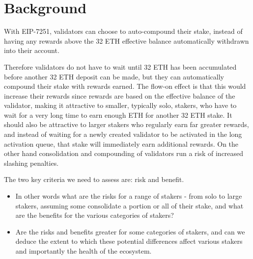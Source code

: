 \documentclass{article}
\begin{document}
%



\section{Background}
\label{EIP-7251}

With EIP-7251, validators can choose to auto-compound their stake, instead of
having any rewards above the 32 ETH effective balance automatically withdrawn
into their account.

Therefore validators do not have to wait until 32 ETH has been accumulated 
before another 32 ETH deposit can be made, but they can automatically compound
their stake with rewards earned. The flow-on effect is that this would increase
their rewards since rewards are based on the effective balance of the
validator, making it attractive to smaller, typically solo, stakers, who have
to wait for a very long time to earn enough ETH for another 32 ETH stake. It
should also be attractive to larger stakers who regularly earn far greater
rewards, and  instead of waiting for a newly created validator to be activated
in the long  activation queue, that stake will immediately earn additional
rewards. On the  other hand consolidation and compounding of validators run a
risk of increased slashing penalties.

The two key criteria we need to assess are: risk and benefit. 
\begin{itemize}
  \item In other words what are the risks for a range of stakers - from solo to
    large stakers, assuming some consolidate a portion or all of their stake,
    and what are the benefits for the various categories of stakers?
  \item  Are the risks and benefits greater for some categories of stakers, and
    can we deduce the extent to which these potential differences affect
    various stakers and importantly the health of the ecosystem.
\end{itemize}
\end{document}
